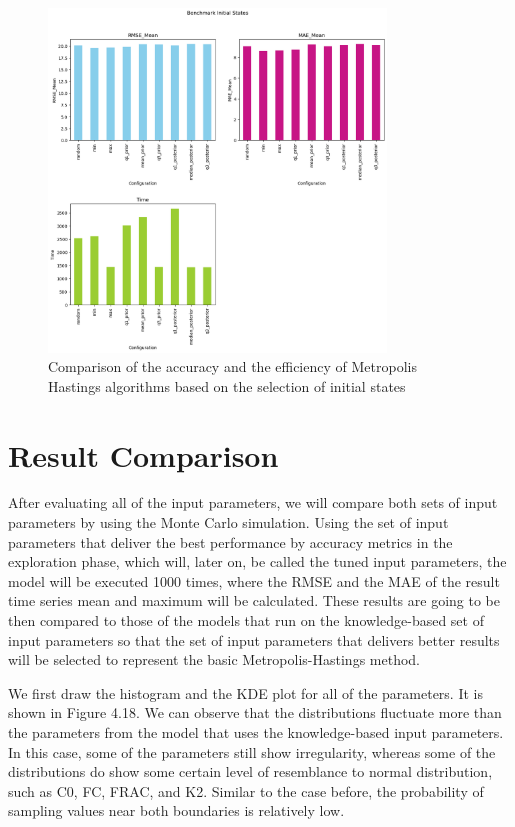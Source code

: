 \begin{figure}
    \centering
    \includegraphics[width=0.8\textwidth]{figures/basic_mh/benchmark/init_method.png}
    \captionsetup{width=.8\textwidth}
    \caption{Comparison of the accuracy and the efficiency of Metropolis Hastings algorithms based on the selection of initial states}
    \label{fig:enter-label}
\end{figure}


\section{Result Comparison}
After evaluating all of the input parameters, we will compare both sets of input parameters by using the Monte Carlo simulation. Using the set of input parameters that deliver the best performance by accuracy metrics in the exploration phase, which will, later on, be called the tuned input parameters, the model will be executed 1000 times, where the RMSE and the MAE of the result time series mean and maximum will be calculated. These results are going to be then compared to those of the models that run on the knowledge-based set of input parameters so that the set of input parameters that delivers better results will be selected to represent the basic Metropolis-Hastings method.

We first draw the histogram and the KDE plot for all of the parameters. It is shown in Figure 4.18. We can observe that the distributions fluctuate more than the parameters from the model that uses the knowledge-based input parameters. In this case, some of the parameters still show irregularity, whereas some of the distributions do show some certain level of resemblance to normal distribution, such as C0, FC, FRAC, and K2. Similar to the case before, the probability of sampling values near both boundaries is relatively low. 

